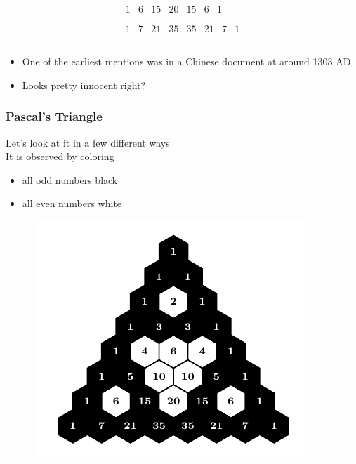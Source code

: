 \documentclass{beamer}
\begin{document}
\begin{frame}
\begin{equation*}
\begin{array}{c}
\begin{array}{ccccccc}
             1 & 6 & 15 & 20 & 15 & 6 & 1 \\
            \end{array}
             \\
            \begin{array}{cccccccc}
             1 & 7 & 21 & 35 & 35 & 21 & 7 & 1 \\
            \end{array}
             \\
            \end{array}
    \end{equation*}
    \begin{itemize}
        \item
        One of the earliest mentions was in a Chinese document at around 1303 AD
        \item
        Looks pretty innocent right?
    \end{itemize}

\end{frame}
\begin{frame}
    \frametitle{Pascal's Triangle}
    Let's look at it in a few different ways \\
    It is observed by coloring 
    \begin{itemize}
        \item all odd numbers black
        \item all even numbers white
    \end{itemize}

    \begin{figure}
        \centering
        \includegraphics[scale=0.8]{Mod2,7.pdf}
    \end{figure}
\end{frame}
\end{document}

